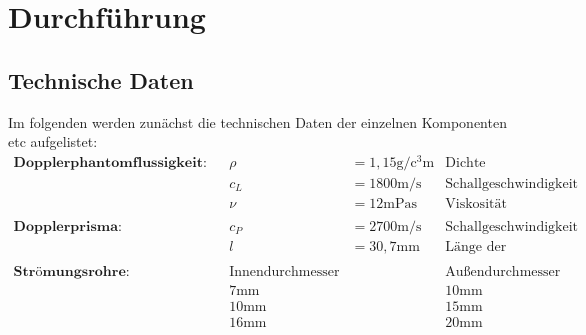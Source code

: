 \section{Durchführung}
\label{sec:Durchführung}
\subsection{Technische Daten} \label{sec:Daten}
Im folgenden werden zunächst die technischen Daten der einzelnen Komponenten etc aufgelistet:
\begin{align*}
    \textbf{Dopplerphantomflussigkeit:} && \rho &= 1,15  \unit\gram / \unit{\cubic\centi\meter} & \text{Dichte} \\
    && c_L &= 1800 \unit\meter / \unit\second & \text{Schallgeschwindigkeit} \\
    && \nu &= 12 \unit{\milli\pascal\second} & \text{Viskosität} \\
    \\
    \textbf{Dopplerprisma:} && c_P &= 2700 \unit\meter / \unit\second & \text{Schallgeschwindigkeit} \\
    && l &= 30,7 \unit{\milli\meter} & \text{Länge der Vorlaufstrecke} \\
    \\
    \textbf{Strömungsrohre:} && \text{Innendurchmesser} && \text{Außendurchmesser} \\
    && 7 \unit{\milli\meter} && 10 \unit{\milli\meter} \\
    && 10 \unit{\milli\meter} && 15 \unit{\milli\meter} \\
    && 16 \unit{\milli\meter} && 20 \unit{\milli\meter} \\
\end{align*}


